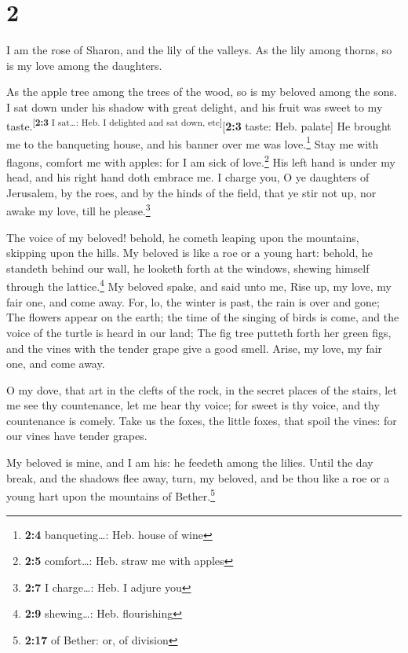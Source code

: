 \hypertarget{section-1}{%
\section{2}\label{section-1}}

 I am the rose of Sharon, and the lily of the valleys.
 As the lily among thorns, so is my love among the
daughters.

 As the apple tree among the trees of the wood, so is my
beloved among the sons. I sat down under his shadow with great delight,
and his fruit was sweet to my taste.\textsuperscript{{[}\textbf{2:3} I
sat\ldots: Heb. I delighted and sat down, etc{]}}{[}\textbf{2:3} taste:
Heb. palate{]}  He brought me to the banqueting house, and
his banner over me was love.\footnote{\textbf{2:4} banqueting\ldots:
  Heb. house of wine}  Stay me with flagons, comfort me
with apples: for I am sick of love.\footnote{\textbf{2:5} comfort\ldots:
  Heb. straw me with apples}  His left hand is under my
head, and his right hand doth embrace me.  I charge you, O
ye daughters of Jerusalem, by the roes, and by the hinds of the field,
that ye stir not up, nor awake my love, till he please.\footnote{\textbf{2:7}
  I charge\ldots: Heb. I adjure you}

 The voice of my beloved! behold, he cometh leaping upon
the mountains, skipping upon the hills.  My beloved is
like a roe or a young hart: behold, he standeth behind our wall, he
looketh forth at the windows, shewing himself through the
lattice.\footnote{\textbf{2:9} shewing\ldots: Heb. flourishing}
 My beloved spake, and said unto me, Rise up, my love, my
fair one, and come away.  For, lo, the winter is past,
the rain is over and gone;  The flowers appear on the
earth; the time of the singing of birds is come, and the voice of the
turtle is heard in our land;  The fig tree putteth forth
her green figs, and the vines with the tender grape give a good smell.
Arise, my love, my fair one, and come away.

 O my dove, that art in the clefts of the rock, in the
secret places of the stairs, let me see thy countenance, let me hear thy
voice; for sweet is thy voice, and thy countenance is comely.
 Take us the foxes, the little foxes, that spoil the
vines: for our vines have tender grapes.

 My beloved is mine, and I am his: he feedeth among the
lilies.  Until the day break, and the shadows flee away,
turn, my beloved, and be thou like a roe or a young hart upon the
mountains of Bether.\footnote{\textbf{2:17} of Bether: or, of division}

